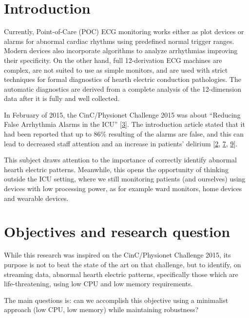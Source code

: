 \documentclass[runningheads]{llncs}
\begin{document}
\hypertarget{introduction}{%
\section{Introduction}\label{introduction}}

Currently, Point-of-Care (POC) ECG monitoring works either as plot devices or alarms for abnormal
cardiac rhythms using predefined normal trigger ranges. Modern devices also incorporate algorithms
to analyze arrhythmias improving their specificity. On the other hand, full 12-derivation ECG
machines are complex, are not suited to use as simple monitors, and are used with strict techniques
for formal diagnostics of hearth electric conduction pathologies. The automatic diagnostics are
derived from a complete analysis of the 12-dimension data after it is fully and well collected.

In February of 2015, the CinC/Physionet Challenge 2015 was about ``Reducing False Arrhythmia Alarms
in the ICU'' {[}\protect\hyperlink{ref-Clifford2015}{3}{]}. The introduction article stated that it had been reported that up to 86\%
resulting of the alarms are false, and this can lead to decreased staff attention and an increase in
patients' delirium {[}\protect\hyperlink{ref-Chambrin2001}{2}, \protect\hyperlink{ref-Lawless1994}{7}, \protect\hyperlink{ref-Parthasarathy2004}{9}{]}.

This subject draws attention to the importance of correctly identify abnormal hearth electric
patterns. Meanwhile, this opens the opportunity of thinking outside the ICU setting, where we still
monitoring patients (and ourselves) using devices with low processing power, as for example ward
monitors, home devices and wearable devices.

\hypertarget{objectives-and-research-question}{%
\section{Objectives and research question}\label{objectives-and-research-question}}

While this research was inspired on the CinC/Physionet Challenge 2015, its purpose is not to beat
the state of the art on that challenge, but to identify, on streaming data, abnormal hearth electric
patterns, specifically those which are life-threatening, using low CPU and low memory requirements.

The main questions is: can we accomplish this objective using a minimalist approach (low CPU, low
memory) while maintaining robustness?
\end{document}
